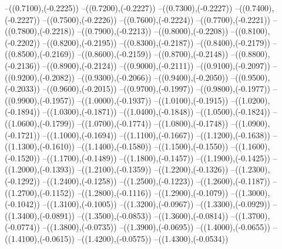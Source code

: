 {	--({\sx*(0.7100)},{\sy*(-0.2225)})
	--({\sx*(0.7200)},{\sy*(-0.2227)})
	--({\sx*(0.7300)},{\sy*(-0.2227)})
	--({\sx*(0.7400)},{\sy*(-0.2227)})
	--({\sx*(0.7500)},{\sy*(-0.2226)})
	--({\sx*(0.7600)},{\sy*(-0.2224)})
	--({\sx*(0.7700)},{\sy*(-0.2221)})
	--({\sx*(0.7800)},{\sy*(-0.2218)})
	--({\sx*(0.7900)},{\sy*(-0.2213)})
	--({\sx*(0.8000)},{\sy*(-0.2208)})
	--({\sx*(0.8100)},{\sy*(-0.2202)})
	--({\sx*(0.8200)},{\sy*(-0.2195)})
	--({\sx*(0.8300)},{\sy*(-0.2187)})
	--({\sx*(0.8400)},{\sy*(-0.2179)})
	--({\sx*(0.8500)},{\sy*(-0.2169)})
	--({\sx*(0.8600)},{\sy*(-0.2159)})
	--({\sx*(0.8700)},{\sy*(-0.2148)})
	--({\sx*(0.8800)},{\sy*(-0.2136)})
	--({\sx*(0.8900)},{\sy*(-0.2124)})
	--({\sx*(0.9000)},{\sy*(-0.2111)})
	--({\sx*(0.9100)},{\sy*(-0.2097)})
	--({\sx*(0.9200)},{\sy*(-0.2082)})
	--({\sx*(0.9300)},{\sy*(-0.2066)})
	--({\sx*(0.9400)},{\sy*(-0.2050)})
	--({\sx*(0.9500)},{\sy*(-0.2033)})
	--({\sx*(0.9600)},{\sy*(-0.2015)})
	--({\sx*(0.9700)},{\sy*(-0.1997)})
	--({\sx*(0.9800)},{\sy*(-0.1977)})
	--({\sx*(0.9900)},{\sy*(-0.1957)})
	--({\sx*(1.0000)},{\sy*(-0.1937)})
	--({\sx*(1.0100)},{\sy*(-0.1915)})
	--({\sx*(1.0200)},{\sy*(-0.1894)})
	--({\sx*(1.0300)},{\sy*(-0.1871)})
	--({\sx*(1.0400)},{\sy*(-0.1848)})
	--({\sx*(1.0500)},{\sy*(-0.1824)})
	--({\sx*(1.0600)},{\sy*(-0.1799)})
	--({\sx*(1.0700)},{\sy*(-0.1774)})
	--({\sx*(1.0800)},{\sy*(-0.1748)})
	--({\sx*(1.0900)},{\sy*(-0.1721)})
	--({\sx*(1.1000)},{\sy*(-0.1694)})
	--({\sx*(1.1100)},{\sy*(-0.1667)})
	--({\sx*(1.1200)},{\sy*(-0.1638)})
	--({\sx*(1.1300)},{\sy*(-0.1610)})
	--({\sx*(1.1400)},{\sy*(-0.1580)})
	--({\sx*(1.1500)},{\sy*(-0.1550)})
	--({\sx*(1.1600)},{\sy*(-0.1520)})
	--({\sx*(1.1700)},{\sy*(-0.1489)})
	--({\sx*(1.1800)},{\sy*(-0.1457)})
	--({\sx*(1.1900)},{\sy*(-0.1425)})
	--({\sx*(1.2000)},{\sy*(-0.1393)})
	--({\sx*(1.2100)},{\sy*(-0.1359)})
	--({\sx*(1.2200)},{\sy*(-0.1326)})
	--({\sx*(1.2300)},{\sy*(-0.1292)})
	--({\sx*(1.2400)},{\sy*(-0.1258)})
	--({\sx*(1.2500)},{\sy*(-0.1223)})
	--({\sx*(1.2600)},{\sy*(-0.1187)})
	--({\sx*(1.2700)},{\sy*(-0.1152)})
	--({\sx*(1.2800)},{\sy*(-0.1116)})
	--({\sx*(1.2900)},{\sy*(-0.1079)})
	--({\sx*(1.3000)},{\sy*(-0.1042)})
	--({\sx*(1.3100)},{\sy*(-0.1005)})
	--({\sx*(1.3200)},{\sy*(-0.0967)})
	--({\sx*(1.3300)},{\sy*(-0.0929)})
	--({\sx*(1.3400)},{\sy*(-0.0891)})
	--({\sx*(1.3500)},{\sy*(-0.0853)})
	--({\sx*(1.3600)},{\sy*(-0.0814)})
	--({\sx*(1.3700)},{\sy*(-0.0774)})
	--({\sx*(1.3800)},{\sy*(-0.0735)})
	--({\sx*(1.3900)},{\sy*(-0.0695)})
	--({\sx*(1.4000)},{\sy*(-0.0655)})
	--({\sx*(1.4100)},{\sy*(-0.0615)})
	--({\sx*(1.4200)},{\sy*(-0.0575)})
	--({\sx*(1.4300)},{\sy*(-0.0534)})
}
